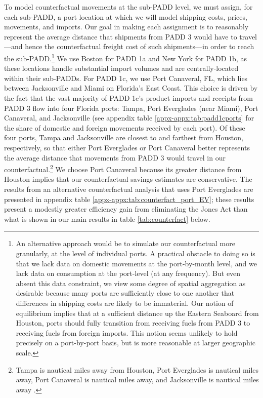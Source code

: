 \documentclass[12pt]{article}
\begin{document}
To model counterfactual movements at the sub-PADD level, we must assign, for each sub-PADD, a port location at which we will model shipping costs, prices, movements, and imports. Our goal in making each assignment is to reasonably represent the average distance that shipments from PADD 3 would have to travel---and hence the counterfactual freight cost of such shipments---in order to reach the sub-PADD.\footnote{An alternative approach would be to simulate our counterfactual more granularly, at the level of individual ports. A practical obstacle to doing so is that we lack data on domestic movements at the port-by-month level, and we lack data on consumption at the port-level (at any frequency). But even absent this data constraint, we view some degree of spatial aggregation as desirable because many ports are sufficiently close to one another that differences in shipping costs are likely to be immaterial. Our notion of equilibrium implies that at a sufficient distance up the Eastern Seaboard from Houston, ports should fully transition from receiving fuels from PADD 3 to receiving fuels from foreign imports. This notion seems unlikely to hold precisely on a port-by-port basis, but is more reasonable at larger geographic scale.} We use Boston for PADD 1a and New York for PADD 1b, as these locations handle substantial import volumes and are centrally-located within their sub-PADDs. For PADD 1c, we use Port Canaveral, FL, which lies between Jacksonville and Miami on Florida's East Coast. This choice is driven by the fact that the vast majority of PADD 1c's product imports and receipts from PADD 3 flow into four Florida ports: Tampa, Port Everglades (near Miami), Port Canaveral, and Jacksonville (see appendix table \ref{appx-appx:tab:padd1cports} for the share of domestic and foreign movements received by each port). Of these four ports, Tampa and Jacksonville are closest to and farthest from Houston, respectively, so that either Port Everglades or Port Canaveral better represents the average distance that movements from PADD 3 would travel in our counterfactual.\footnote{Tampa is nautical miles away from Houston, Port Everglades is nautical miles away, Port Canaveral is nautical miles away, and Jacksonville is nautical miles away \citep{Searoutes2023}.}  We choose Port Canaveral because its greater distance from Houston implies that our counterfactual savings estimates are conservative. The results from an alternative counterfactual analysis that uses Port Everglades are presented in appendix table \ref{appx-appx:tab:counterfact_port_EV}; these results present a modestly greater efficiency gain from eliminating the Jones Act than what is shown in our main results in table \ref{tab:counterfact} below.
\end{document}
